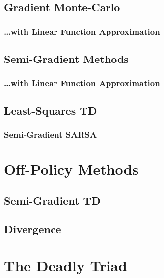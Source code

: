 		\subsection{Gradient Monte-Carlo} %

			\subsubsection{\dots with Linear Function Approximation} %

		\subsection{Semi-Gradient Methods} %

			\subsubsection{\dots with Linear Function Approximation} %

		\subsection{Least-Squares TD} %

			\subsubsection{Semi-Gradient SARSA} %

	\section{Off-Policy Methods} %

		\subsection{Semi-Gradient TD} %

		\subsection{Divergence} %

	\section{The Deadly Triad} %


